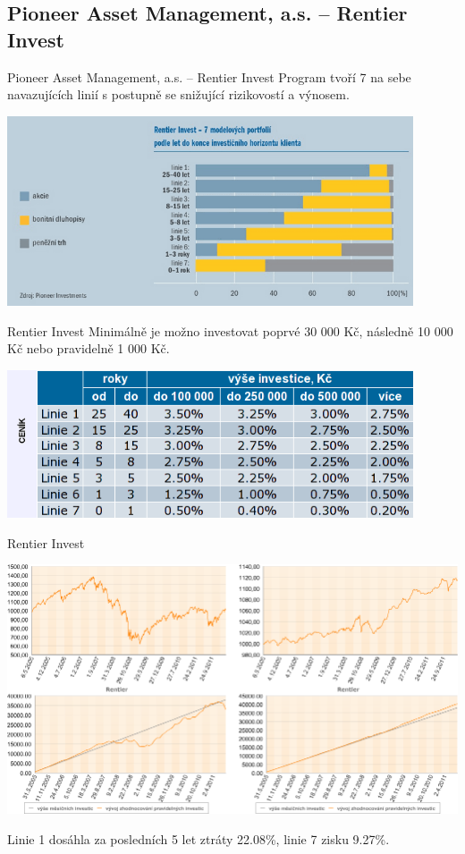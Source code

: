 \documentclass[xcolor=dvipsnames]{beamer}
\begin{document}
	\subsection{Pioneer Asset Management, a.s. -- Rentier Invest}
	\begin{frame}{Pioneer Asset Management, a.s. -- Rentier Invest}
		Program tvoří 7 na sebe navazujících linií s postupně se snižující rizikovostí a výnosem.
		\begin{center}
			\includegraphics[width=0.9\textwidth]{graf_alokace_linii.png}
		\end{center}
	\end{frame}
	\begin{frame}{Rentier Invest}
		Minimálně je možno investovat poprvé 30 000 Kč, následně 10 000 Kč nebo pravidelně 1 000 Kč.
		\begin{center}
			\includegraphics[width=0.9\textwidth]{ri_cost.png}
		\end{center}
	\end{frame}
		\begin{frame}{Rentier Invest}
		\begin{center}
			\includegraphics[width=1.0\textwidth]{ri_graf.png}
		\end{center}
		Linie 1 dosáhla za posledních 5 let ztráty 22.08\%, linie 7 zisku 9.27\%.
	\end{frame}
\end{document}
